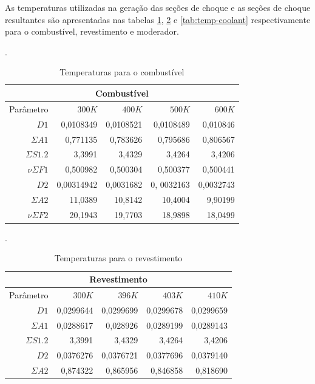 As temperaturas utilizadas na geração das seções de choque
e as seções de choque resultantes são apresentadas nas tabelas \ref{tab:temp-fuel},
\ref{tab:temp-cladding} e \ref{tab:temp-coolant} respectivamente para o combustível, revestimento
e moderador.


\begin{table}[htb]
  \centering
  \caption[Temperaturas para combustível.]{Temperaturas para o combustível}.
  \label{tab:temp-fuel}
  \begin{tabular}{r r r r r}
  \multicolumn{5}{c}{Combustível} \\
  \hline
  Parâmetro & $300K$ & $400K$ & $500K$ & $600K$ \\
  \hline
  $D1$ & 0,0108349 & 0,0108521 & 0,0108489 & 0,010846\\
  $\Sigma A1$ & 0,771135 & 0,783626 & 0,795686 & 0,806567\\
  $\Sigma S1.2$ & 3,3991 & 3,4329 & 3,4264 & 3,4206\\
  $\nu \Sigma F1$ & 0,500982 & 0,500304 & 0,500377 & 0,500441\\
  \hline
  $D2$ & 0,00314942 & 0,0031682 & 0, 0032163 & 0,0032743 \\
  $\Sigma A2$ & 11,0389 & 10,8142 & 10,4004 & 9,90199\\
  $\nu \Sigma F2$ & 20,1943 & 19,7703 & 18,9898 & 18,0499\\
  \hline
\end{tabular}
\end{table}

\begin{table}[htb]
  \centering
  \caption[Temperaturas para o revestimento.]{Temperaturas para o revestimento}.
  \label{tab:temp-cladding}
  \begin{tabular}{r r r r r}
    \multicolumn{5}{c}{Revestimento} \\
    \hline
    Parâmetro & $300K$ & $396K$ & $403K$ & $410K$ \\
    \hline
    $D1$ & 0,0299644 & 0,0299699 & 0,0299678 & 0,0299659 \\
    $\Sigma A1$ & 0,0288617 & 0,028926 & 0,0289199 & 0,0289143 \\
    $\Sigma S1.2$ & 3,3991 & 3,4329 & 3,4264 & 3,4206\\
    \hline
    $D2$ & 0,0376276 & 0,0376721 & 0,0377696 & 0,0379140\\
    $\Sigma A2$ & 0,874322 & 0,865956 & 0,846858 & 0,818690\\
    \hline
  \end{tabular}
\end{table}

